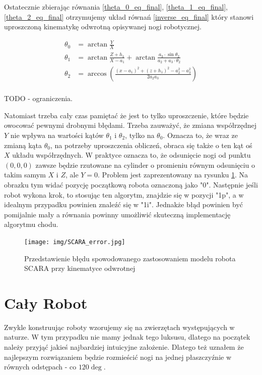 Ostatecznie zbierając równania \ref{theta_0_eq_final}, \ref{theta_1_eq_final}, \ref{theta_2_eq_final} otrzymujemy układ równań \ref{inverse_eq_final} który stanowi uproszczoną kinematykę odwrotną opisywanej nogi robotycznej.

\begin{equation}\label{inverse_eq_final}
\begin{split}
\theta_0 &= \arctan{\frac{Y}{X}}\\
\theta_1 &= \arctan{\frac{Z + h_1}{X - a_1}} + \arctan{\frac{a_3 \cdot \sin{\theta_2}}{a_2 + a_3 \cdot{\theta_2}}}\\ 
\theta_2 &= \arccos{\left( \frac{(x - a_1)^2 + (z + h_1)^2 - a_2^2 - a_3^2}{2 a_2 a_3} \right)}\\
\end{split}
\end{equation}

TODO - ograniczenia.

Natomiast trzeba cały czas pamiętać że jest to tylko uproszczenie, które będzie owocować pewnymi drobnymi błędami. Trzeba zauważyć, że zmiana współrzędnej $Y$ nie wpływa na wartości kątów $\theta_1$ i $\theta_2$, tylko na $\theta_0$. Oznacza to, że wraz ze zmianą kąta $\theta_0$, na potrzeby uproszczenia obliczeń, obraca się także o ten kąt oś $X$ układu współrzędnych. W praktyce oznacza to, że odsunięcie nogi od punktu $(0, 0, 0)$ zawsze będzie rzutowane na cylinder o promieniu równym odsunięciu o takim samym $X$ i $Z$, ale $Y = 0$. Problem jest zaprezentowany na rysunku \ref{SCARA_error}. Na obrazku tym widać pozycję początkową robota oznaczoną jako "0". Następnie jeśli robot wykona krok, to stosując ten algorytm, znajdzie się w pozycji "1p", a w idealnym przypadku powinien znaleźć się w "1i". Jednakże błąd powinien być pomijalnie mały a równania powinny umożliwić skuteczną implementację algorytmu chodu.

\begin{figure}[h!]
\texttt{[image: img/SCARA\_error.jpg]}
\caption{Przedstawienie błędu spowodowanego zastosowaniem modelu robota SCARA przy kinematyce odwrotnej}
\label{SCARA_error}
\end{figure}


\section{Cały Robot}
Zwykle konstruując roboty wzorujemy się na zwierzętach występujących w naturze. W tym przypadku nie mamy jednak tego luksusu, dlatego na początek należy przyjąć jakieś najbardziej intuicyjne założenie. Dlatego też uznałem że najlepszym rozwiązaniem będzie rozmieścić nogi na jednej płaszczyźnie w równych odstępach - co $120\deg$.

